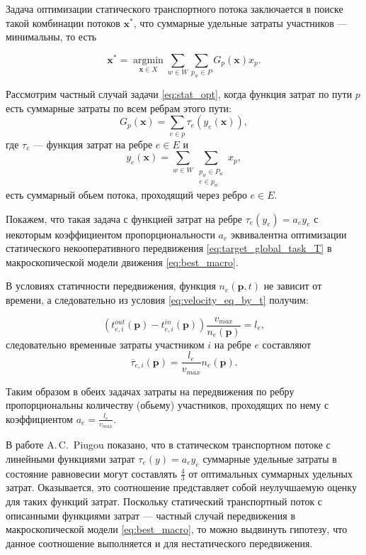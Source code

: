 \documentclass[12pt, a4paper]{article}
\DeclareMathOperator*{\argmin}{argmin}
\begin{document}
Задача оптимизации статического транспортного потока заключается в поиске такой комбинации потоков $\textbf{x}^*$, что суммарные удельные затраты участников --- минимальны, то есть

\begin{equation}
	\label{eq:stat_opt}
	\textbf{x}^* = \argmin\limits_{\textbf{x} \in X} \sum\limits_{w \in W} \sum \limits_{p_w \in P} G_p (\textbf{x}) x_p.
\end{equation}

Рассмотрим частный случай задачи \eqref{eq:stat_opt}, когда функция затрат по пути $p$ есть суммарные затраты по всем ребрам этого пути:
\begin{equation*}
	G_p (\textbf{x}) = \sum\limits_{e \in p} \tau_e (y_e (\textbf{x})),
\end{equation*}
где $\tau_e$ --- функция затрат на ребре $e \in E$ и
\begin{equation}
	\label{eq:y_e}
	y_e (\textbf{x}) = \sum\limits_{w \in W} \sum \limits_{\substack{p_w \in P_w \\ e \in p_w}} x_p,
\end{equation}
есть суммарный обьем потока, проходящий через ребро $e \in E$. 

Покажем, что такая задача с функцией затрат на ребре $\tau_e (y_e) = a_e y_e$ с некоторым коэффициентом пропорциональности $a_e$ эквивалентна оптимизации статического некооперативного передвижения \eqref{eq:target_global_task_T} в макроскопической модели движения \eqref{eq:best_macro}.

В условиях статичности передвижения, функция $n_e (\textbf{p}, t)$ не зависит от времени, а следовательно из условия \eqref{eq:velocity_eq_by_t} получим:

$$\left(t_{e, i}^{out}(\textbf{p}) - t_{e, i}^{in}(\textbf{p})\right) \frac{v_{max}}{n_e (\textbf{p})} = l_e,$$
следовательно временные затраты участником $i$ на ребре $e$ составляют
$$\overline{\tau}_{e, i}(\textbf{p}) = \frac{l_e}{v_{max}}n_e(\textbf{p}).$$

Таким образом в обеих задачах затраты на передвижения по ребру пропорциональны количеству (обьему) участников, проходящих по нему с коэффициентом $a_e = \frac{l_e}{v_{max}}$.

В работе A.\,C.~Piugou \cite{piugou} показано, что в статическом транспортном потоке с линейными функциями затрат $\tau_e(y) = a_e y_e$ суммарные удельные затраты в состояние равновесии могут составлять $\frac{4}{3}$ от оптимальных суммарных удельных затрат. Оказывается, это соотношение представляет собой неулучшаемую оценку для таких функций затрат. Поскольку статический транспортный поток с описанными функциями затрат --- частный случай передвижения в макроскопической модели \eqref{eq:best_macro}, то можно выдвинуть гипотезу, что данное соотношение выполняется и для нестатического передвижения.
\end{document}
